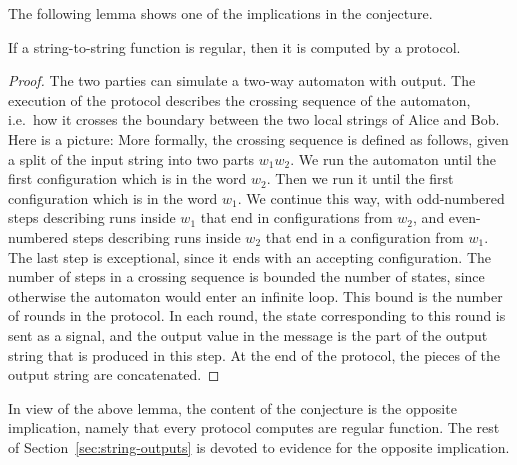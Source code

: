     The following lemma shows one of the implications in the conjecture.

\begin{lemma}\label{lem:from-regular-to-protocol}
    If a string-to-string function is regular, then it is computed by a protocol.
\end{lemma}
\begin{proof}
    The two parties can simulate a two-way automaton with output. The execution of the protocol describes the crossing sequence of the automaton, i.e.~how it crosses the boundary between the two local strings of Alice and Bob. Here is a picture: 
    More formally, the crossing sequence is defined as follows, given  a split of the input string into two parts $w_1 w_2$. We run the automaton until the first configuration which is in the word $w_2$. Then we run it until the first configuration which is in the word $w_1$. We continue this way, with odd-numbered steps describing runs inside $w_1$ that end in  configurations from $w_2$, and even-numbered steps describing runs inside $w_2$ that end in a configuration from $w_1$. The last step is exceptional, since it ends with an accepting configuration. 
    The number of steps in a crossing sequence is bounded  the number of states, since otherwise the automaton would enter an infinite loop. This bound is the number of rounds in the protocol. In each round, the state corresponding to this round is sent as a signal, and the output value in the message is the  part of the output string that is produced in this  step. At the end of the protocol, the pieces of the output string are concatenated. 
\end{proof}

In view of the above lemma, the content of the conjecture is the opposite implication, namely that every protocol computes are regular function.  The rest of Section~\ref{sec:string-outputs} is devoted to  evidence for the opposite implication.



